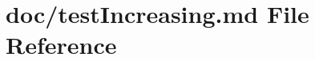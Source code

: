 \hypertarget{test_increasing_8md}{}\section{doc/test\+Increasing.md File Reference}
\label{test_increasing_8md}
